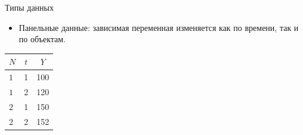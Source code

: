 \documentclass[c, handout]{beamer} %
\begin{document}
	\begin{frame}{Типы данных}
			\begin{itemize}
				\item Панельные данные: зависимая переменная изменяется как по времени, так и по объектам. 
			\end{itemize}
			\begin{center}
				\def\arraystretch{1.5}
				\begin{tabular}{l| c| c}
					\hline
					$N$ & $t$ & $Y$ \\
					\hline
					$1$ & 1 & 100 \\
					$1$ & 2 & 120  \\
					$2$ & 1 & 150 \\
					$2$ & 2 & 152  \\
				\end{tabular}
			\end{center}
	\end{frame}
\end{document}
